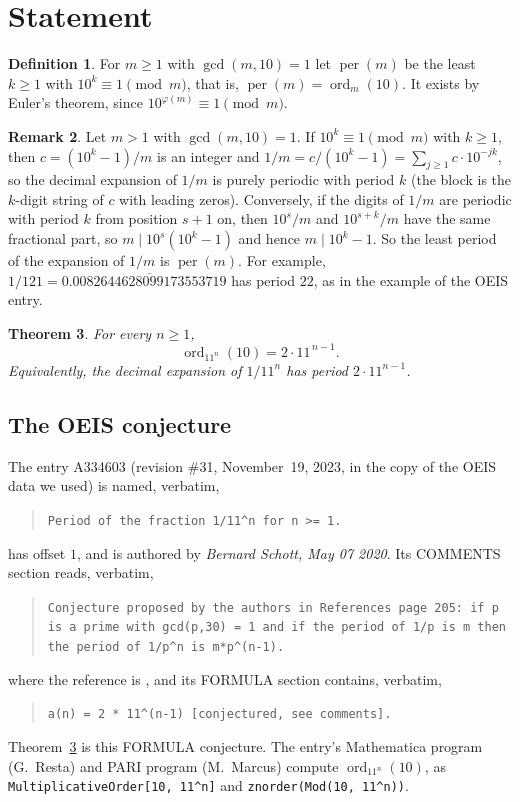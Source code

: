 \documentclass[11pt]{amsart}
\theoremstyle{plain}
\newtheorem{theorem}{Theorem}
\theoremstyle{definition}
\newtheorem{definition}[theorem]{Definition}
\newtheorem{remark}[theorem]{Remark}
\newcommand{\ord}{\operatorname{ord}}
\newcommand{\per}{\operatorname{per}}
\begin{document}
\section{Statement}\label{sec:statement}

\begin{definition}\label{def:per}
For $m\ge1$ with $\gcd(m,10)=1$ let $\per(m)$ be the least $k\ge1$ with $10^k\equiv1\pmod m$, that is, $\per(m)=\ord_m(10)$. It exists by Euler's theorem, since $10^{\varphi(m)}\equiv1\pmod m$.
\end{definition}

\begin{remark}\label{rem:period}
Let $m>1$ with $\gcd(m,10)=1$. If $10^k\equiv1\pmod m$ with $k\ge1$, then $c=(10^k-1)/m$ is an integer and $1/m=c/(10^k-1)=\sum_{j\ge1}c\cdot10^{-jk}$, so the decimal expansion of $1/m$ is purely periodic with period $k$ (the block is the $k$-digit string of $c$ with leading zeros).
Conversely, if the digits of $1/m$ are periodic with period $k$ from position $s+1$ on, then $10^s/m$ and $10^{s+k}/m$ have the same fractional part, so $m\mid 10^s(10^k-1)$ and hence $m\mid 10^k-1$.
So the least period of the expansion of $1/m$ is $\per(m)$.
For example, $1/121=0.\overline{0082644628099173553719}$ has period $22$, as in the example of the OEIS entry.
\end{remark}

\begin{theorem}\label{thm:main}
For every $n\ge1$,
\[
  \ord_{11^n}(10)=2\cdot 11^{\,n-1}.
\]
Equivalently, the decimal expansion of $1/11^n$ has period $2\cdot11^{n-1}$.
\end{theorem}

\subsection*{The OEIS conjecture}
The entry A334603 \cite{A334603} (revision \#31, November~19, 2023, in the copy of the OEIS data we used) is named, verbatim,
\begin{quote}\small\texttt{Period of the fraction 1/11\^{}n for n >= 1.}\end{quote}
has offset $1$, and is authored by \emph{Bernard Schott, May 07 2020}. Its COMMENTS section reads, verbatim,
\begin{quote}\small\texttt{Conjecture proposed by the authors in References page 205: if p is a prime with gcd(p,30) = 1 and if the period of 1/p is m then the period of 1/p\^{}n is m*p\^{}(n-1).}\end{quote}
where the reference is \cite{DKM}, and its FORMULA section contains, verbatim,
\begin{quote}\small\texttt{a(n) = 2 * 11\^{}(n-1) [conjectured, see comments].}\end{quote}
Theorem~\ref{thm:main} is this FORMULA conjecture. The entry's Mathematica program (G.~Resta) and PARI program (M.~Marcus) compute $\ord_{11^n}(10)$, as \texttt{MultiplicativeOrder[10, 11\^{}n]} and \texttt{znorder(Mod(10, 11\^{}n))}.
\end{document}
